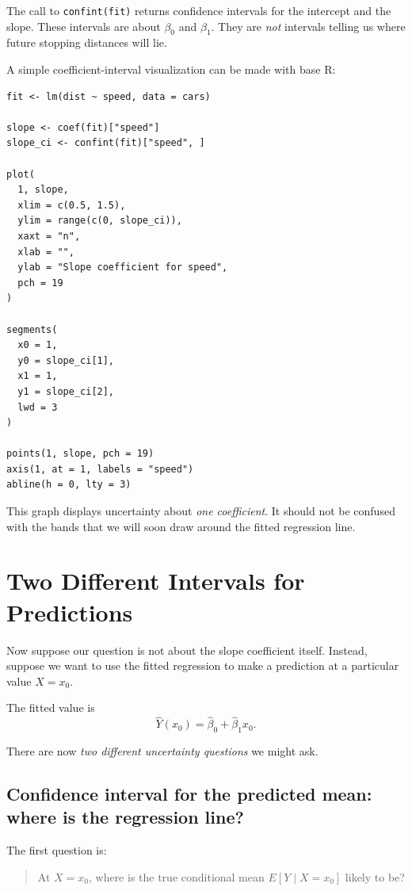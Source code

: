 \documentclass[11pt]{report}
\begin{document}
The call to \texttt{confint(fit)} returns confidence intervals for the intercept and the slope. These intervals are about \(\beta_0\) and \(\beta_1\). They are \emph{not} intervals telling us where future stopping distances will lie.

A simple coefficient-interval visualization can be made with base R:

\begin{lstlisting}
fit <- lm(dist ~ speed, data = cars)

slope <- coef(fit)["speed"]
slope_ci <- confint(fit)["speed", ]

plot(
  1, slope,
  xlim = c(0.5, 1.5),
  ylim = range(c(0, slope_ci)),
  xaxt = "n",
  xlab = "",
  ylab = "Slope coefficient for speed",
  pch = 19
)

segments(
  x0 = 1,
  y0 = slope_ci[1],
  x1 = 1,
  y1 = slope_ci[2],
  lwd = 3
)

points(1, slope, pch = 19)
axis(1, at = 1, labels = "speed")
abline(h = 0, lty = 3)
\end{lstlisting}

This graph displays uncertainty about \emph{one coefficient}. It should not be confused with the bands that we will soon draw around the fitted regression line.

\section{Two Different Intervals for Predictions}

Now suppose our question is not about the slope coefficient itself. Instead, suppose we want to use the fitted regression to make a prediction at a particular value \(X=x_0\).

The fitted value is
\[
\widehat{Y}(x_0)
=
\widehat{\beta}_0+\widehat{\beta}_1x_0.
\]

There are now \emph{two different uncertainty questions} we might ask.

\subsection{Confidence interval for the predicted mean: where is the regression line?}

The first question is:

\begin{quote}
At \(X=x_0\), where is the true conditional mean \(E[Y\mid X=x_0]\) likely to be?
\end{quote}
\end{document}
